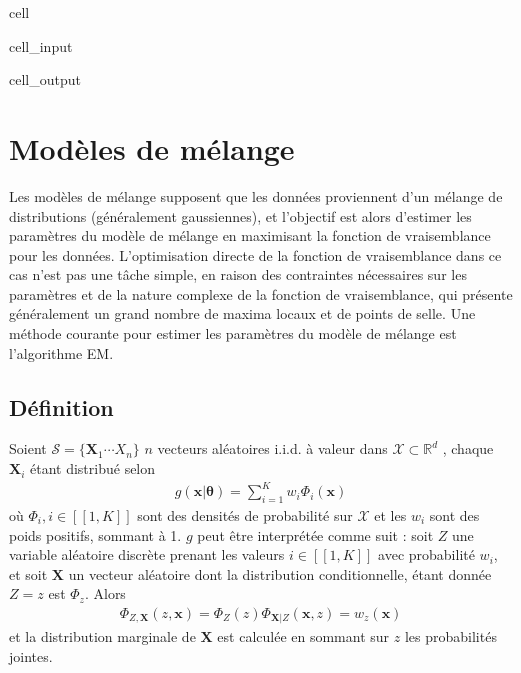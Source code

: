 \documentclass[letterpaper,10pt,english]{jupyterBook}
\begin{document}
\begin{sphinxuseclass}{cell}
\begin{sphinxVerbatimInput}
\begin{sphinxuseclass}{cell_input}
\end{sphinxuseclass}\end{sphinxVerbatimInput}
\begin{sphinxVerbatimOutput}

\begin{sphinxuseclass}{cell_output}
\noindent{}

\end{sphinxuseclass}\end{sphinxVerbatimOutput}

\end{sphinxuseclass}

\section{Modèles de mélange}
\label{\detokenize{clustering:modeles-de-melange}}
\sphinxAtStartPar
Les modèles de mélange supposent que les données proviennent d’un mélange de distributions (généralement gaussiennes), et l’objectif est alors d’estimer les paramètres du modèle de mélange en maximisant la fonction de vraisemblance pour les données.
L’optimisation directe de la fonction de vraisemblance dans ce cas n’est pas une tâche simple, en raison des contraintes nécessaires sur les paramètres et de la nature complexe de la fonction de vraisemblance, qui présente généralement un grand nombre de maxima locaux et de points de selle. Une méthode courante pour estimer les paramètres du modèle de mélange est l’algorithme EM.


\subsection{Définition}
\label{\detokenize{clustering:definition}}
\sphinxAtStartPar
Soient \(\mathcal S = \{\mathbf X_1\cdots X_n\}\) \(n\) vecteurs aléatoires i.i.d. à valeur dans \(\mathcal X\subset \mathbb{R}^d\) , chaque \(\mathbf X_i\) étant distribué selon
\begin{equation*}
\begin{split}g(\mathbf x|\boldsymbol \theta) = \displaystyle\sum_{i=1}^K w_i\Phi_i(\mathbf x)\end{split}
\end{equation*}
\sphinxAtStartPar
où \(\Phi_i,i\in[\![1,K]\!]\) sont des densités de probabilité sur \(\mathcal X\) et les \(w_i\) sont des poids positifs, sommant à 1. \(g\) peut être interprétée comme suit : soit \(Z\) une variable aléatoire discrète prenant les valeurs \(i\in[\![1,K]\!]\) avec probabilité \(w_i\), et soit \(\mathbf X\) un vecteur aléatoire dont la distribution conditionnelle, étant donnée \(Z=z\) est \(\Phi_z\). Alors
\begin{equation*}
\begin{split}\Phi_{Z,\mathbf X}(z,\mathbf x) = \Phi_Z(z)\Phi_{\mathbf X|Z}(\mathbf x,z) = w_z(\mathbf x)\end{split}
\end{equation*}
\sphinxAtStartPar
et la distribution marginale de \(\mathbf X\) est calculée en sommant sur \(z\) les probabilités jointes.
\end{document}
